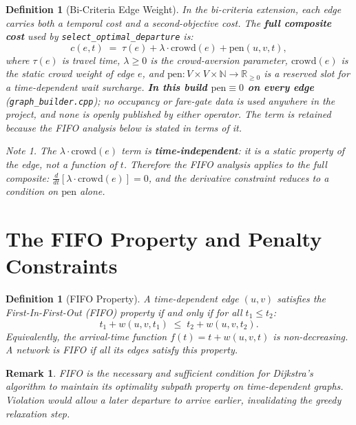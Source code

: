 \documentclass[11pt, a4paper]{article}
\newtheorem{definition}[theorem]{Definition}
\newtheorem{remark}[theorem]{Remark}
\theoremstyle{remark}
\newtheorem*{note}{Note}
\newcommand{\R}{\mathbb{R}}
\newcommand{\N}{\mathbb{N}}
\newcommand{\crowd}{\mathrm{crowd}}
\newcommand{\pen}{\mathrm{pen}}
\begin{document}
\begin{definition}[Bi-Criteria Edge Weight]
    In the bi-criteria extension, each edge carries both a temporal cost and
    a second-objective cost. The \textbf{full composite cost} used by
    \texttt{select\_optimal\_departure} is:
    \[
        c(e, t) \;=\; \tau(e) + \lambda \cdot \crowd(e) + \pen(u, v, t),
    \]
    where $\tau(e)$ is travel time, $\lambda \ge 0$ is the crowd-aversion
    parameter, $\crowd(e)$ is the static crowd weight of edge $e$, and
    $\pen: V \times V \times \N \to \R_{\ge 0}$ is a reserved slot for a
    time-dependent wait surcharge. \textbf{In this build $\pen \equiv 0$ on every
    edge} (\texttt{graph\_builder.cpp}); no occupancy or fare-gate data is used
    anywhere in the project, and none is openly published by either operator.
    The term is retained because the FIFO analysis below is stated in terms of it.

    \begin{note}
    The $\lambda \cdot \crowd(e)$ term is \textbf{time-independent}: it is a
    static property of the edge, not a function of $t$. Therefore the FIFO
    analysis applies to the full composite:
    $\frac{d}{dt}[\lambda \cdot \crowd(e)] = 0$, and the derivative constraint
    reduces to a condition on $\pen$ alone.
    \end{note}
\end{definition}

\section{The FIFO Property and Penalty Constraints}

\begin{definition}[FIFO Property]
    A time-dependent edge $(u, v)$ satisfies the \emph{First-In-First-Out
    (FIFO) property} if and only if for all $t_1 \le t_2$:
    \[
        t_1 + w(u, v, t_1) \;\le\; t_2 + w(u, v, t_2).
    \]
    Equivalently, the arrival-time function $f(t) = t + w(u, v, t)$ is
    non-decreasing. A network is FIFO if all its edges satisfy this property.
\end{definition}

\begin{remark}
    FIFO is the necessary and sufficient condition for Dijkstra's algorithm to
    maintain its optimality subpath property on time-dependent graphs. Violation
    would allow a later departure to arrive earlier, invalidating the greedy
    relaxation step.
\end{remark}
\end{document}
